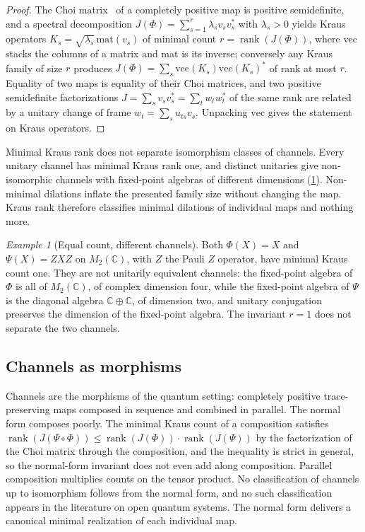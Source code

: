 \documentclass[11pt,letterpaper]{article}
\theoremstyle{definition}
\theoremstyle{remark}
\newtheorem{example}[theorem]{Example}
\begin{document}
\begin{proof}
The Choi matrix~\cite{choi,kraus} of a completely positive map is positive semidefinite, and a spectral decomposition $J(\Phi) = \sum_{s=1}^{r} \lambda_s v_s v_s^*$ with $\lambda_s > 0$ yields Kraus operators $K_s = \sqrt{\lambda_s} \, \mathrm{mat}(v_s)$ of minimal count $r = \operatorname{rank}(J(\Phi))$, where vec stacks the columns of a matrix and mat is its inverse; conversely any Kraus family of size $r$ produces $J(\Phi) = \sum_s \mathrm{vec}(K_s) \mathrm{vec}(K_s)^*$ of rank at most $r$. Equality of two maps is equality of their Choi matrices, and two positive semidefinite factorizations $J = \sum_s v_s v_s^* = \sum_t w_t w_t^*$ of the same rank are related by a unitary change of frame $w_t = \sum_s u_{ts} v_s$. Unpacking $\mathrm{vec}$ gives the statement on Kraus operators.
\end{proof}

Minimal Kraus rank does not separate isomorphism classes of channels. Every unitary channel has minimal Kraus rank one, and distinct unitaries give non-isomorphic channels with fixed-point algebras of different dimensions (\cref{ex:equal-count}). Non-minimal dilations inflate the presented family size without changing the map. Kraus rank therefore classifies minimal dilations of individual maps and nothing more.

\begin{example}[Equal count, different channels]
\label{ex:equal-count}
Both $\Phi(X) = X$ and $\Psi(X) = Z X Z$ on $M_2(\mathbb{C})$, with $Z$ the Pauli $Z$ operator, have minimal Kraus count one. They are not unitarily equivalent channels: the fixed-point algebra of $\Phi$ is all of $M_2(\mathbb{C})$, of complex dimension four, while the fixed-point algebra of $\Psi$ is the diagonal algebra $\mathbb{C} \oplus \mathbb{C}$, of dimension two, and unitary conjugation preserves the dimension of the fixed-point algebra. The invariant $r = 1$ does not separate the two channels.
\end{example}

\subsection{Channels as morphisms}

Channels are the morphisms of the quantum setting: completely positive trace-preserving maps composed in sequence and combined in parallel. The normal form composes poorly. The minimal Kraus count of a composition satisfies $\operatorname{rank}(J(\Psi \circ \Phi)) \leq \operatorname{rank}(J(\Phi)) \cdot \operatorname{rank}(J(\Psi))$ by the factorization of the Choi matrix through the composition, and the inequality is strict in general, so the normal-form invariant does not even add along composition. Parallel composition multiplies counts on the tensor product. No classification of channels up to isomorphism follows from the normal form, and no such classification appears in the literature on open quantum systems. The normal form delivers a canonical minimal realization of each individual map.
\end{document}
